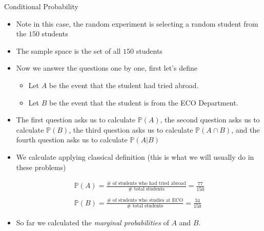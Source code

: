 \documentclass[8pt, usepdftitle = false]{beamer}
\begin{document}
\begin{frame}[allowframebreaks]{Conditional Probability}
\begin{itemize}
\begin{itemize}
\medskip


\item[] \textbf{Note:} In future, often we will omit the phrase \emph{``randomly selected''}... but whenever there is a question about probability, it means we are talking about a random experiment. 


\end{itemize}
\medskip

\framebreak

\item Note in this case, the random experiment is selecting a random student from the $150$ students

\item The sample space is the set of all $150$ students

\item Now we answer the questions one by one, first let's define


\begin{itemize}

\item Let $A$ be the event that the student had tried abroad. 

\item Let $B$ be the event that the student is from the ECO Department. 

\end{itemize}


\medskip

\item The first question asks us to calculate $\mathbb{P}(A)$, the second question asks us to calculate $\mathbb{P}(B)$, the third question asks us to calculate $\mathbb{P}(A \cap B)$, and the fourth question asks us to calculate $\mathbb{P}(A|B)$

\framebreak

\item We calculate applying classical definition (this is what we will usually do in these problems)

\begin{align*}
\mathbb{P}(A) = \frac{\# \text{ of students who had tried abroad} }{\# \text{ total students} } = \frac{77}{150} \\
\\
\mathbb{P}(B) = \frac{\# \text{ of students who studies at ECO} }{\# \text{ total students} } = \frac{34}{150}
\end{align*}



\item So far  we calculated the \emph{marginal probabilities} of $A$ and $B$. 


\end{itemize}
\end{frame}
\end{document}
